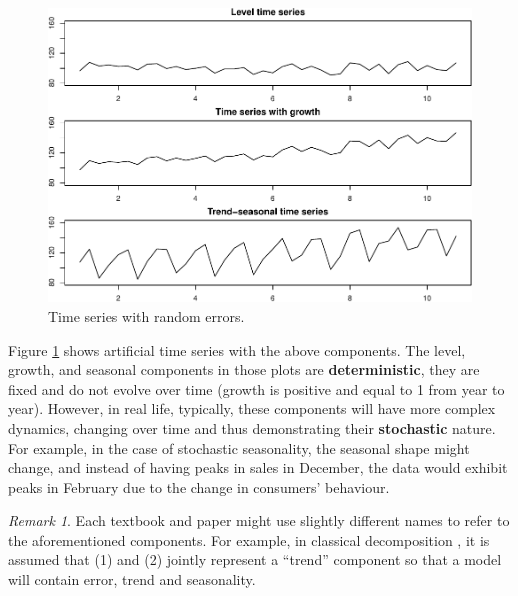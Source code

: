\documentclass[
]{book}
\theoremstyle{definition}
\theoremstyle{definition}
\theoremstyle{definition}
\theoremstyle{definition}
\theoremstyle{remark}
\newtheorem*{remark}{Remark}
\begin{document}
\begin{figure}
\centering
\includegraphics{Svetunkov--2022----ADAM_files/figure-latex/allExample-1.pdf}
\caption{\label{fig:allExample}Time series with random errors.}
\end{figure}

Figure \ref{fig:allExample} shows artificial time series with the above components. The level, growth, and seasonal components in those plots are \textbf{deterministic}, they are fixed and do not evolve over time (growth is positive and equal to 1 from year to year). However, in real life, typically, these components will have more complex dynamics, changing over time and thus demonstrating their \textbf{stochastic} nature. For example, in the case of stochastic seasonality, the seasonal shape might change, and instead of having peaks in sales in December, the data would exhibit peaks in February due to the change in consumers' behaviour.

\begin{remark}
Each textbook and paper might use slightly different names to refer to the aforementioned components. For example, in classical decomposition \citep{Persons1919}, it is assumed that (1) and (2) jointly represent a ``trend'' component so that a model will contain error, trend and seasonality.
\end{remark}
\end{document}

